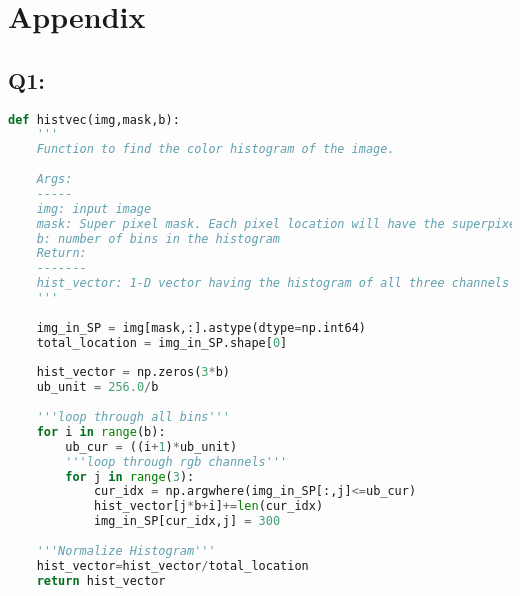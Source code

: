 \documentclass[12pt]{article}
\begin{document}
\section*{Appendix}
\subsection*{Q1:}
\begin{lstlisting}[language=python]
def histvec(img,mask,b):
	'''
	Function to find the color histogram of the image.
	
	Args:
	-----
	img: input image
	mask: Super pixel mask. Each pixel location will have the superpixel label corresponding to it
	b: number of bins in the histogram
	Return:
	-------
	hist_vector: 1-D vector having the histogram of all three channels appended
	'''
	
	img_in_SP = img[mask,:].astype(dtype=np.int64)
	total_location = img_in_SP.shape[0]
	
	hist_vector = np.zeros(3*b)
	ub_unit = 256.0/b
	
	'''loop through all bins'''
	for i in range(b):
		ub_cur = ((i+1)*ub_unit)
		'''loop through rgb channels'''
		for j in range(3):
			cur_idx = np.argwhere(img_in_SP[:,j]<=ub_cur)
			hist_vector[j*b+i]+=len(cur_idx)
			img_in_SP[cur_idx,j] = 300
	
	'''Normalize Histogram'''
	hist_vector=hist_vector/total_location    
	return hist_vector
\end{lstlisting}
\pagebreak
\end{document}
